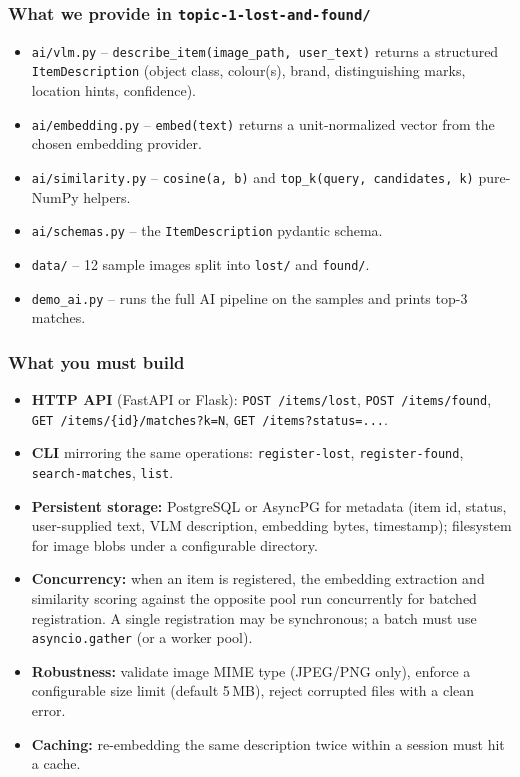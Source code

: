 \documentclass[11pt,a4paper]{article}
\begin{document}
\subsubsection{What we provide in \texttt{topic-1-lost-and-found/}}
\begin{itemize}[topsep=2pt,itemsep=1pt]
  \item \texttt{ai/vlm.py} -- \texttt{describe\_item(image\_path, user\_text)} returns a structured \texttt{ItemDescription} (object class, colour(s), brand, distinguishing marks, location hints, confidence).
  \item \texttt{ai/embedding.py} -- \texttt{embed(text)} returns a unit-normalized vector from the chosen embedding provider.
  \item \texttt{ai/similarity.py} -- \texttt{cosine(a, b)} and \texttt{top\_k(query, candidates, k)} pure-NumPy helpers.
  \item \texttt{ai/schemas.py} -- the \texttt{ItemDescription} pydantic schema.
  \item \texttt{data/} -- 12 sample images split into \texttt{lost/} and \texttt{found/}.
  \item \texttt{demo\_ai.py} -- runs the full AI pipeline on the samples and prints top-3 matches.
\end{itemize}

\subsubsection{What you must build}
\begin{itemize}[topsep=2pt,itemsep=1pt]
  \item \textbf{HTTP API} (FastAPI or Flask): \texttt{POST /items/lost}, \texttt{POST /items/found}, \texttt{GET /items/\{id\}/matches?k=N}, \texttt{GET /items?status=...}.
  \item \textbf{CLI} mirroring the same operations: \texttt{register-lost}, \texttt{register-found}, \texttt{search-matches}, \texttt{list}.
  \item \textbf{Persistent storage:} PostgreSQL or AsyncPG for metadata (item id, status, user-supplied text, VLM description, embedding bytes, timestamp); filesystem for image blobs under a configurable directory.
  \item \textbf{Concurrency:} when an item is registered, the embedding extraction and similarity scoring against the opposite pool run concurrently for batched registration. A single registration may be synchronous; a batch must use \texttt{asyncio.gather} (or a worker pool).
  \item \textbf{Robustness:} validate image MIME type (JPEG/PNG only), enforce a configurable size limit (default 5\,MB), reject corrupted files with a clean error.
  \item \textbf{Caching:} re-embedding the same description twice within a session must hit a cache.
\end{itemize}
\end{document}
